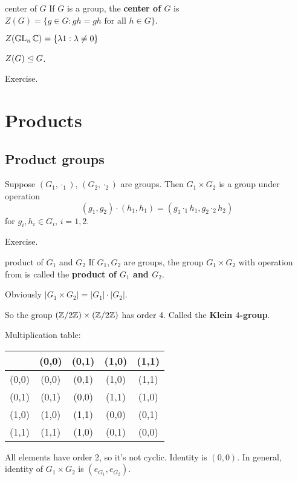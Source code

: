 \begin{defn}{center of $G$}
If $G$ is a group, the \textbf{center of $G$} is $Z(G)=\{g\in G:gh=gh \text{ for all }h\in G\}$.
\end{defn}

\begin{ex}
$Z(\operatorname{GL}_n \mathbb{C}) = \{\lambda 1: \lambda \ne 0\}$
\end{ex}

\begin{prop}
$Z(G)\trianglelefteq G$.
\end{prop}

\begin{pf}
Exercise.
\end{pf}

\chapter{Products}
\section{Product groups}
\begin{prop}
Suppose $(G_1,\cdot_1)$, $(G_2,\cdot_2)$ are groups. Then $G_1\times G_2$ is a group under operation
$$
(g_1,g_2)\cdot (h_1,h_1)=(g_1\cdot_1 h_1,g_2\cdot_2 h_2)
$$
for $g_i,h_i\in G_i$, $i=1,2$.
\end{prop}

\begin{pf}
Exercise.
\end{pf}

\begin{defn}{product of $G_1$ and $G_2$}
If $G_1,G_2$ are groups, the group $G_1\times G_2$ with operation from  is called the \textbf{product of $G_1$ and $G_2$}.
\end{defn}

\begin{ex}
Obviously $|G_1\times G_2|=|G_1|\cdot |G_2|$.

So the group $(\mathbb Z/{2}\mathbb Z)\times (\mathbb Z/{2}\mathbb Z)$ has order 4. Called the \textbf{Klein $4$-group}.

Multiplication table: 
\begin{tabular}{c | c c c c}
& (0,0) & (0,1) & (1,0) & (1,1)\\\hline
(0,0) & (0,0) &  (0,1) & (1,0) & (1,1)\\
(0,1) & (0,1) & (0,0) & (1,1) & (1,0)\\
(1,0) & (1,0) & (1,1) & (0,0) & (0,1)\\
(1,1) & (1,1) & (1,0) & (0,1) & (0,0)
\end{tabular}

All elements have order 2, so it's not cyclic. Identity is $(0,0)$. In general, identity of $G_1\times G_2$ is $(e_{G_1},e_{G_2})$.
\end{ex}

